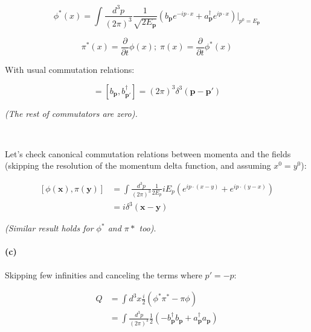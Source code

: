 \documentclass[11pt]{article}
\begin{document}
\begin{equation}
\phi^*(x) = \int \frac{d^3p}{(2 \pi)^3}
  \frac{1}{ \sqrt{ 2 E_\mathbf{p} } }
  \left( b_\mathbf{p} e^{-i p \cdot x} +
         a^\dagger_\mathbf{p} e^{i p \cdot x}
         \right) \bigg\rvert_{p^0 = E_\mathbf{p}}
\end{equation}

\begin{equation}
\pi^*(x) = \frac{\partial}{\partial{t}} \phi(x) ; \;
\pi(x) = \frac{\partial}{\partial{t}} \phi^*(x)
\end{equation}

With usual commutation relations:

\begin{equation}
[ a_\mathbf{p}, a^\dagger_\mathbf{p'} ] =
  [ b_\mathbf{p}, b^\dagger_\mathbf{p'} ] =
  (2 \pi)^3 \delta^3(\mathbf{p} - \mathbf{p}')
\end{equation}

\textit{(The rest of commutators are zero).}

\

Let's check canonical commutation relations between momenta and
the fields (skipping the resolution of the momentum delta function,
and assuming $x^0 = y^0$):

\begin{equation}
\begin{split}
[ \phi(\mathbf{x}), \pi(\mathbf{y}) ] &
  = \int \frac{d^3p}{(2\pi)^3}
    \frac{1}{2 E_p} i E_p \left(
    e^{ip \cdot (x - y)} + e^{ip \cdot (y - x)} \right) \\
  & = i \delta^3 (\mathbf{x} - \mathbf{y})
\end{split}
\end{equation}

\textit{(Similar result holds for $\phi^*$ and $\pi*$ too)}.

\paragraph*{(c)} Skipping few infinities and canceling the terms
where $p' = -p$:

\begin{equation}
\begin{split}
Q & = \int d^3x \frac{i}{2} \left( \phi^* \pi^* - \pi \phi \right) \\
  & = \int \frac{d^3p}{(2 \pi)^3}
    \frac{1}{2}
    \left(
    	-b^\dagger_\mathbf{p} b_\mathbf{p} +
    	a^\dagger_\mathbf{p} a_\mathbf{p}
    \right)
\end{split}
\end{equation}
\end{document}
